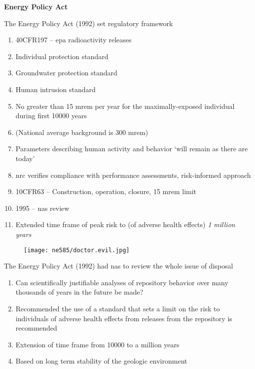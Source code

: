\documentclass[aspectratio=1610,pdftex,dvipsnames,compress,xcolor={dvipsnames}]{beamer}
\newcommand{\acs}{\acrshort} %
\begin{document}
\begin{frame}[plain]{}
    \centering\LARGE\textbf{Energy Policy Act}
\end{frame}


\addtocounter{framenumber}{-1} 
\begin{frame}{The Energy Policy Act (1992) set regulatory framework}
    \begin{enumerate}[series=outerlist,topsep=0pt,itemsep=7pt,leftmargin=*,label=(\arabic*)]
        \item[]40CFR197 -- \acs{epa} radioactivity releases
        \item[]Individual protection standard   
        \item[]Groundwater protection standard   
        \item[]Human intrusion standard  
        \item[]No greater than 15 mrem per year for the maximally-exposed individual during first 10000 years
        \item[](National average background is 300 mrem)
        \item[]Parameters describing human activity and behavior `will remain as there are today'
        \item[]\acs{nrc} verifies compliance with performance assessments, risk-informed approach
        \item[]10CFR63 -- Construction, operation, closure, 15 mrem limit
        \item[]1995 -- \acs{nas} review
        \item[]Extended time frame of peak risk to (of adverse health effects) \textit{1 million years} 
    \end{enumerate}
\end{frame}


\begin{frame}{}
    \begin{figure}
        \centering
        \texttt{[image: ne585/doctor.evil.jpg]}
    \end{figure}
\end{frame}


\begin{frame}{The Energy Policy Act (1992) had \acs{nas} to review the whole issue of disposal}
    \begin{enumerate}[series=outerlist,topsep=0pt,itemsep=21pt,leftmargin=*,label=(\arabic*)]
        \item[]Can scientifically justifiable analyses of repository behavior over many thousands of years in the future be made?
        \item[]Recommended the use of a standard that sets a limit on the risk to individuals of adverse
health effects from releases from the repository is recommended
        \item[]Extension of time frame from 10000 to a million years
        \item[]Based on long term stability of the geologic environment
    \end{enumerate}
\end{frame}
\end{document}
